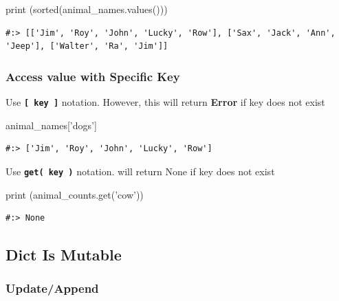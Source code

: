 \documentclass[
]{book}
\newenvironment{Shaded}{\begin{snugshade}}{\end{snugshade}}
\newcommand{\BuiltInTok}[1]{#1}
\newcommand{\NormalTok}[1]{#1}
\newcommand{\StringTok}[1]{\textcolor[rgb]{0.5,0.5,0.5}{#1}}
\begin{document}
\begin{Shaded}
\begin{Highlighting}[]
\BuiltInTok{print}\NormalTok{ (}\BuiltInTok{sorted}\NormalTok{(animal_names.values()))}
\end{Highlighting}
\end{Shaded}

\begin{verbatim}
#:> [['Jim', 'Roy', 'John', 'Lucky', 'Row'], ['Sax', 'Jack', 'Ann', 'Jeep'], ['Walter', 'Ra', 'Jim']]
\end{verbatim}

\hypertarget{access-value-with-specific-key}{%
\subsubsection{Access value with Specific Key}\label{access-value-with-specific-key}}

Use \textbf{\texttt{{[}\ key\ {]}}} notation. However, this will return \textbf{Error} if key does not exist

\begin{Shaded}
\begin{Highlighting}[]
\NormalTok{animal_names[}\StringTok{'dogs'}\NormalTok{]}
\end{Highlighting}
\end{Shaded}

\begin{verbatim}
#:> ['Jim', 'Roy', 'John', 'Lucky', 'Row']
\end{verbatim}

Use \textbf{\texttt{get(\ key\ )}} notation. will return None if key does not exist

\begin{Shaded}
\begin{Highlighting}[]
\BuiltInTok{print}\NormalTok{ (animal_counts.get(}\StringTok{'cow'}\NormalTok{))}
\end{Highlighting}
\end{Shaded}

\begin{verbatim}
#:> None
\end{verbatim}

\hypertarget{dict-is-mutable}{%
\subsection{Dict Is Mutable}\label{dict-is-mutable}}

\hypertarget{updateappend}{%
\subsubsection{Update/Append}\label{updateappend}}
\end{document}
